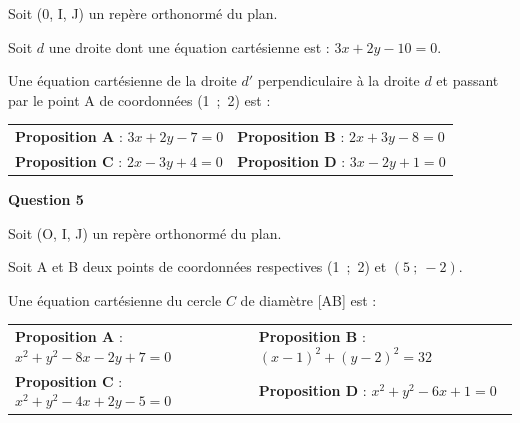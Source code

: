 \documentclass[10pt]{article}
\begin{document}
\medskip

Soit (0, I, J) un repère orthonormé du plan.

Soit $d$ une droite dont une équation cartésienne est : $3x + 2y - 10 = 0$.

Une équation cartésienne de la droite $d'$ perpendiculaire à la droite $d$ et passant par le point A de coordonnées (1~;~2) est :

\begin{center}
\begin{tabularx}{\linewidth}{*{2}X}
\textbf{Proposition A }: $ 3x+2y- 7 = 0$&\textbf{Proposition B }: $2x +3y - 8= 0 $ \\
\textbf{Proposition C }: $2x- 3y+4 = 0$	& \textbf{Proposition D }: $3x - 2y +1 = 0$
\end{tabularx}
\end{center}

\medskip

\textbf{Question 5}

\medskip

Soit (O, I, J) un repère orthonormé du plan.

Soit A et B deux points de coordonnées respectives (1~;~2) et $(5~;~-2)$. 

Une équation cartésienne du cercle $C$ de diamètre [AB] est :

\begin{center}
\begin{tabularx}{\linewidth}{*{2}X}
\textbf{Proposition A }: $ x^2+y^2 - 8x- 2y + 7 = 0$ 	&\textbf{Proposition B }: $(x- 1)^2+(y - 2)^2 = 32$\\ \textbf{Proposition C }: $x^2 + y^2 - 4x +2y - 5 = 0$	& \textbf{Proposition D }: $x^2+y^2 -6x + 1 = 0$
\end{tabularx}
\end{center}


\vspace{0,5cm}
\end{document}
